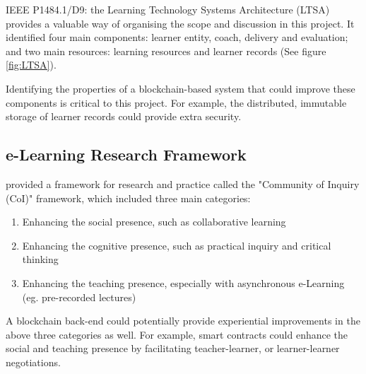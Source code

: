 IEEE P1484.1/D9: the Learning Technology Systems Architecture (LTSA) provides a valuable way of organising 
the scope and discussion in this project. It identified four main components: learner entity, coach, 
delivery and evaluation; and two main resources: learning resources and learner records (See figure \ref{fig:LTSA}).

Identifying the properties of a blockchain-based system that could improve these components is 
critical to this project. For example, the distributed, immutable storage of learner records could 
provide extra security.

\subsection{e-Learning Research Framework}

\citet{garrison2011learning} provided a framework for research and practice called the "Community 
of Inquiry (CoI)" framework, which included three main categories:

\begin{enumerate}
    \item Enhancing the social presence, such as collaborative learning
    \item Enhancing the cognitive presence, such as practical inquiry and critical thinking
    \item Enhancing the teaching presence, especially with asynchronous e-Learning (eg. pre-recorded lectures)
\end{enumerate}

A blockchain back-end could potentially provide experiential improvements in the above three categories as well. 
For example, smart contracts could enhance the social and teaching presence by facilitating teacher-learner, or 
learner-learner negotiations.



